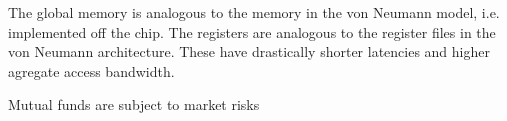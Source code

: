 The global memory is analogous to the memory in the von Neumann model,
 i.e. implemented off the chip. The registers are analogous to the 
 register files in the von Neumann architecture. These have
 drastically shorter latencies and higher agregate access bandwidth.

 Mutual funds are subject to market risks

